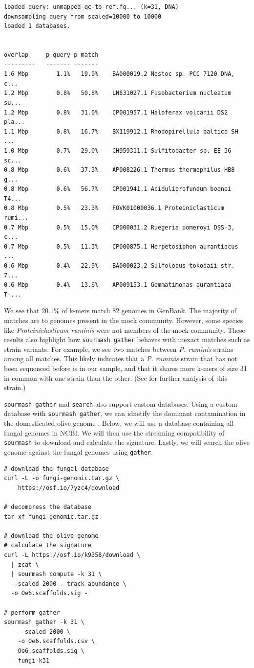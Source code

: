 \documentclass[10pt,a4paper,twocolumn]{article}
\begin{document}
\begin{lstlisting}[basicstyle=\tiny,]
loaded query: unmapped-qc-to-ref.fq... (k=31, DNA)
downsampling query from scaled=10000 to 10000
loaded 1 databases.


overlap     p_query p_match
---------   ------- -------
1.6 Mbp        1.1%   19.9%    BA000019.2 Nostoc sp. PCC 7120 DNA, c...
1.2 Mbp        0.8%   50.8%    LN831027.1 Fusobacterium nucleatum su...
1.2 Mbp        0.8%   31.0%    CP001957.1 Haloferax volcanii DS2 pla...
1.1 Mbp        0.8%   16.7%    BX119912.1 Rhodopirellula baltica SH ...
1.0 Mbp        0.7%   29.0%    CH959311.1 Sulfitobacter sp. EE-36 sc...
0.8 Mbp        0.6%   37.3%    AP008226.1 Thermus thermophilus HB8 g...
0.8 Mbp        0.6%   56.7%    CP001941.1 Aciduliprofundum boonei T4...
0.8 Mbp        0.5%   23.3%    FOVK01000036.1 Proteiniclasticum rumi...
0.7 Mbp        0.5%   15.0%    CP000031.2 Ruegeria pomeroyi DSS-3, c...
0.7 Mbp        0.5%   11.3%    CP000875.1 Herpetosiphon aurantiacus ...
0.6 Mbp        0.4%   22.9%    BA000023.2 Sulfolobus tokodaii str. 7...
0.6 Mbp        0.4%   13.6%    AP009153.1 Gemmatimonas aurantiaca T-...
\end{lstlisting}

We see that 20.1\% of k-mers match 82 genomes in GenBank. The majority of matches are to genomes present in the mock community. However, some species like \textit{Proteiniclasticum ruminis} were not members of the mock community. These results also highlight how \lstinline{sourmash gather} behaves with inexact matches such as strain variants. For example, we see two matches between \textit{P. ruminis} strains among all matches. This likely indicates that a \textit{P. ruminis} strain that has not been sequenced before is in our sample, and that it shares more k-mers of size 31 in common with one strain than the other. (See \cite{spacegraphcats} for further analysis of this strain.)

\lstinline{sourmash gather} and \lstinline{search} also support custom databases. Using a custom database with \lstinline{sourmash gather}, we can idnetify the dominant contamination in the domesticated olive genome \cite{Reiter2018}. Below, we will use a database containing all fungal genomes in NCBI. We will then use the streaming compatibility of \lstinline{sourmash} to download and calculate the signature. Lastly, we will search the olive genome against the fungal genomes using \lstinline{gather}.

\begin{lstlisting}
# download the fungal database
curl -L -o fungi-genomic.tar.gz \ 
    https://osf.io/7yzc4/download

# decompress the database
tar xf fungi-genomic.tar.gz 

# download the olive genome 
# calculate the signature
curl -L https://osf.io/k9358/download \ 
  | zcat \ 
  | sourmash compute -k 31 \ 
  --scaled 2000 --track-abundance \ 
  -o Oe6.scaffolds.sig -
 
# perform gather
sourmash gather -k 31 \ 
    --scaled 2000 \ 
    -o Oe6.scaffolds.csv \
    Oe6.scaffolds.sig \ 
    fungi-k31
\end{lstlisting}
\end{document}
